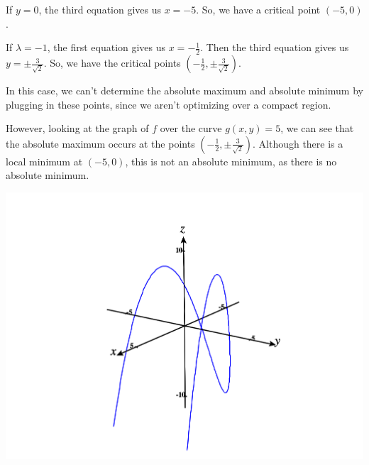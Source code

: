 \documentclass{ximera}
\begin{document}
\begin{example}
If $y=0$, the third equation gives us $x=-5$. So, we have a critical point $(-5,0)$.

If $\lambda =-1$, the first equation gives us $x= -\frac{1}{2}$. Then the third equation gives us $y=\pm\frac{3}{\sqrt{2}}$. So, we have the critical points $\left(-\frac{1}{2}, \pm\frac{3}{\sqrt{2}}\right)$.

In this case, we can't determine the absolute maximum and absolute minimum by plugging in these points, since we aren't optimizing over a compact region.

However, looking at the graph of $f$ over the curve $g(x,y) = 5$, we can see that the absolute maximum occurs at the points $\left(-\frac{1}{2}, \pm\frac{3}{\sqrt{2}}\right)$. Although there is a local minimum at $(-5,0)$, this is not an absolute minimum, as there is no absolute minimum.

\begin{image}
\includegraphics[width = \textwidth]{CalcPlot3D-constraint}
\end{image}

\end{example}
\end{document}
